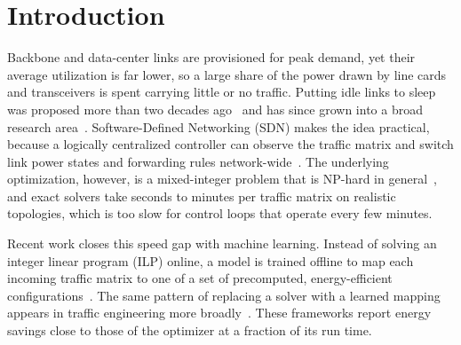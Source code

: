\documentclass[conference]{IEEEtran}
\newif\ifplaceholders
\begin{document}
\ifplaceholders
\noindent\fcolorbox{cRed}{cRed!6}{\parbox{0.96\columnwidth}{\footnotesize\textbf{Draft notice.} All experimental values in this version (abstract, Tables~\ref{tab:main}--\ref{tab:emu}, Figs.~\ref{fig:pareto}--\ref{fig:drift}) are planning placeholders generated by \texttt{paper/tools/make\_placeholder\_data.py}. They must be replaced by measured values before submission. Set \texttt{\textbackslash placeholdersfalse} only after that replacement.}}
\fi

\section{Introduction}

Backbone and data-center links are provisioned for peak demand, yet their average utilization is far lower, so a large share of the power drawn by line cards and transceivers is spent carrying little or no traffic. Putting idle links to sleep was proposed more than two decades ago~\cite{gupta2003greening} and has since grown into a broad research area~\cite{bianzino2012survey,bolla2011energy}. Software-Defined Networking (SDN) makes the idea practical, because a logically centralized controller can observe the traffic matrix and switch link power states and forwarding rules network-wide~\cite{mckeown2008openflow,kreutz2015sdn}. The underlying optimization, however, is a mixed-integer problem that is NP-hard in general~\cite{chiaraviglio2012minimizing}, and exact solvers take seconds to minutes per traffic matrix on realistic topologies, which is too slow for control loops that operate every few minutes.

Recent work closes this speed gap with machine learning. Instead of solving an integer linear program (ILP) online, a model is trained offline to map each incoming traffic matrix to one of a set of precomputed, energy-efficient configurations~\cite{gomezdelahiz2025noms,gomezdelahiz2026tgcn}. The same pattern of replacing a solver with a learned mapping appears in traffic engineering more broadly~\cite{xu2023teal,perry2023dote,abuzaid2021ncflow}. These frameworks report energy savings close to those of the optimizer at a fraction of its run time.
\end{document}
